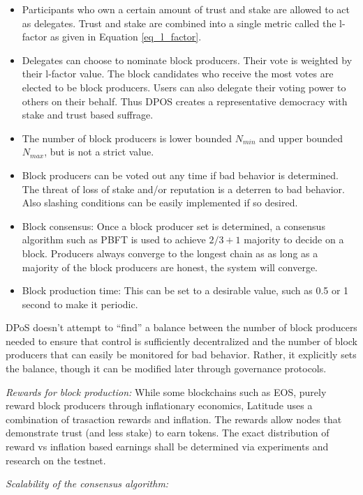\begin{itemize}
\item Participants who own a certain amount of trust and stake are allowed to act as delegates. Trust and stake are
    combined into a single metric called the l-factor as given in Equation \ref{eq_l_factor}.
\item Delegates can choose to nominate block producers. Their vote is weighted by their l-factor value. The block
    candidates who receive the most votes are elected to be block producers. Users can also delegate their voting power
        to others on their behalf. Thus DPOS creates a representative democracy with stake and trust based suffrage.
\item The number of block producers is lower bounded $N_{min}$ and upper bounded $N_{max}$, but is not a strict value.

\item Block producers can be voted out any time if bad behavior is determined. The threat of loss of stake and/or
    reputation is a deterren to bad behavior. Also slashing conditions can be easily implemented if so desired.
\item Block consensus: Once a block producer set is determined, a consensus algorithm such as PBFT is used to
    achieve $2/3 +1$ majority to decide on a block. Producers always converge to the longest chain as as long as a
        majority of the block producers are honest, the system will converge.
\item Block production time: This can be set to a desirable value, such as 0.5 or 1 second to make it periodic.
\end{itemize}

DPoS doesn’t attempt to “find” a balance between the number of block producers needed to ensure that control is
sufficiently decentralized and the number of block producers that can easily be monitored for bad behavior. Rather, it
explicitly sets the balance, though it can be modified later through governance protocols.

\noindent
{\em Rewards for block production:} While some blockchains such as EOS, purely reward block producers through inflationary
economics, Latitude uses a combination of trasaction rewards and inflation. The rewards allow nodes that demonstrate
trust (and less stake) to earn tokens. The exact distribution of reward vs inflation based earnings shall be determined
via experiments and research on the testnet.

\noindent
{\em Scalability of the consensus algorithm:}

